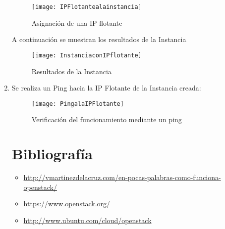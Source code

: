 \documentclass[10pt]{article}   			%
\begin{document}
\begin{enumerate}
\begin{figure}[ht] %
	\centering
	\texttt{[image: IPFlotantealainstancia]}   %
	\caption{Asignación de una IP flotante} \label{fig:Elementos}
\end{figure}


A continuación se muestran los resultados de la Instancia 


\begin{figure}[H] %
	\centering
	\texttt{[image: InstanciaconIPflotante]}   %
	\caption{Resultados de la Instancia} \label{fig:Elementos}
\end{figure}
\newpage
\item Se realiza un Ping hacia la IP Flotante de la Instancia creada:

\begin{figure}[H] %
	\centering
	\texttt{[image: PingalaIPFlotante]}   %
	\caption{Verificación del funcionamiento mediante un ping} \label{fig:Elementos}
\end{figure}

\section{Bibliografía}

\begin{itemize}
	\item \href{http://vmartinezdelacruz.com/en-pocas-palabras-como-funciona-openstack/}{http://vmartinezdelacruz.com/en-pocas-palabras-como-funciona-openstack/}
	\item \href{https://www.openstack.org/
		}{https://www.openstack.org/
		}
	\item \href{http://www.ubuntu.com/cloud/openstack
		}{http://www.ubuntu.com/cloud/openstack
		}
	
\end{itemize}
	

\end{enumerate}

	
\end{document}
